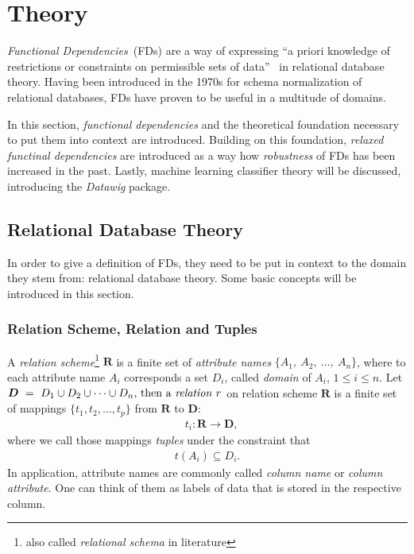 \newpage
\section{Theory}
\emph{Functional Dependencies}~(FDs) are a way of expressing ``a priori knowledge of restrictions or constraints on permissible sets of data''~\cite[p.~42]{MAI83} in relational database theory.
Having been introduced in the 1970s for schema normalization of relational databases, FDs have proven to be useful in a multitude of domains.

In this section, \emph{functional dependencies} and the theoretical foundation necessary to put them into context are introduced.
Building on this foundation, \emph{relaxed functinal dependencies} are introduced as a way how \emph{robustness} of FDs has been increased in the past.
Lastly, machine learning classifier theory will be discussed, introducing the \emph{Datawig} package.

\subsection{Relational Database Theory}
In order to give a definition of FDs, they need to be put in context to the domain they stem from: relational database theory. Some basic concepts will be introduced in this section.

\subsubsection{Relation Scheme, Relation and Tuples}
A \emph{relation scheme}\footnote{also called \emph{relational schema} in literature\cite[p.21]{ABE19} } \(\boldsymbol{R}\) is a finite set of \emph{attribute names} \(\{A_1,~A_2,~\dots,~A_n\}\), where to each attribute name \(A_i\) corresponds a set \(D_i\), called \emph{domain} of \(A_i\), \(1 \leq i \leq n\).
Let \(\boldsymbol{D}~=~D_1 \cup D_2 \cup \dots \cup D_n$, then a \emph{relation} \(r\) on relation scheme \(\boldsymbol{R}\) is a finite set of mappings \(\{t_1, t_2, \dots, t_p\}\) from \(\boldsymbol{R}\) to \(\boldsymbol{D}\):
\begin{align*}
  &t_i: \boldsymbol{R} \to \boldsymbol{D},
\end{align*}
where we call those mappings \emph{tuples} under the constraint that~\cite[p.2]{MAI83}
\begin{align*}
    t(A_i) \subseteq D_i.
\end{align*}
In application, attribute names are commonly called \emph{column name} or \emph{column attribute}.
One can think of them as labels of data that is stored in the respective column.


